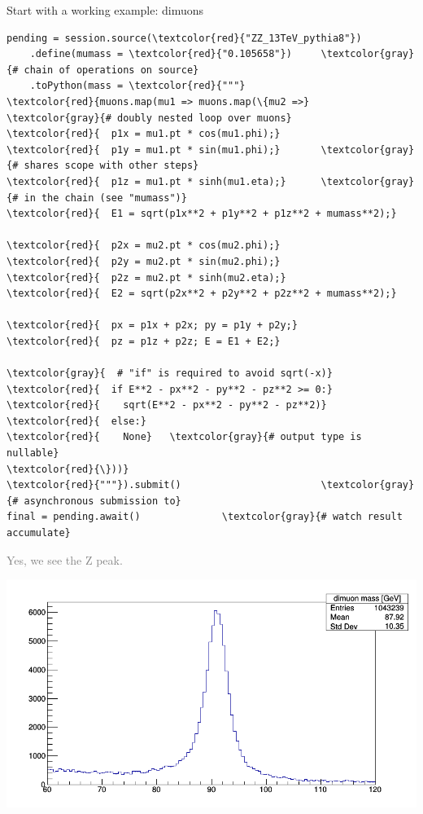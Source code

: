 \documentclass{beamer}
\begin{document}
\begin{frame}[fragile]{Start with a working example: dimuons}
\vspace{0.15 cm}
\scriptsize
\begin{Verbatim}[commandchars=\\\{\}]
pending = session.source(\textcolor{red}{"ZZ_13TeV_pythia8"})
    .define(mumass = \textcolor{red}{"0.105658"})     \textcolor{gray}{# chain of operations on source}
    .toPython(mass = \textcolor{red}{"""}
\textcolor{red}{muons.map(mu1 => muons.map(\{mu2 =>}   \textcolor{gray}{# doubly nested loop over muons}
\textcolor{red}{  p1x = mu1.pt * cos(mu1.phi);}
\textcolor{red}{  p1y = mu1.pt * sin(mu1.phi);}       \textcolor{gray}{# shares scope with other steps}
\textcolor{red}{  p1z = mu1.pt * sinh(mu1.eta);}      \textcolor{gray}{# in the chain (see "mumass")}
\textcolor{red}{  E1 = sqrt(p1x**2 + p1y**2 + p1z**2 + mumass**2);}

\textcolor{red}{  p2x = mu2.pt * cos(mu2.phi);}
\textcolor{red}{  p2y = mu2.pt * sin(mu2.phi);}
\textcolor{red}{  p2z = mu2.pt * sinh(mu2.eta);}
\textcolor{red}{  E2 = sqrt(p2x**2 + p2y**2 + p2z**2 + mumass**2);}

\textcolor{red}{  px = p1x + p2x; py = p1y + p2y;}
\textcolor{red}{  pz = p1z + p2z; E = E1 + E2;}

\textcolor{gray}{  # "if" is required to avoid sqrt(-x)}
\textcolor{red}{  if E**2 - px**2 - py**2 - pz**2 >= 0:}
\textcolor{red}{    sqrt(E**2 - px**2 - py**2 - pz**2)}
\textcolor{red}{  else:}
\textcolor{red}{    None}   \textcolor{gray}{# output type is nullable}
\textcolor{red}{\}))}
\textcolor{red}{"""}).submit()                        \textcolor{gray}{# asynchronous submission to}
final = pending.await()              \textcolor{gray}{# watch result accumulate}
\end{Verbatim}

\vspace{-4 cm}
\hfill \textcolor{gray}{Yes, we see the Z peak.\hspace{0.25 cm}}

\vspace{-0.2 cm}
\hfill \mbox{\includegraphics[width=0.48\linewidth]{c1.png}\hspace{-1 cm}}
\vspace{4 cm}
\end{frame}
\end{document}
